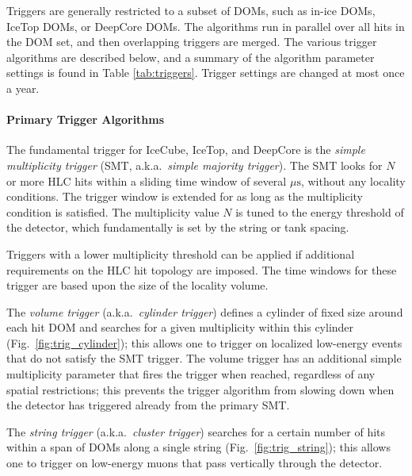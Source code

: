 Triggers are generally restricted to a subset of DOMs, such as in-ice DOMs,
IceTop DOMs, or DeepCore DOMs.  The algorithms run in parallel over all
hits in the DOM set, and then overlapping triggers are merged.   The
various trigger algorithms are described below, and a summary of the
algorithm parameter settings is found in Table \ref{tab:triggers}.  Trigger
settings are changed at most once a year.

\paragraph{Primary Trigger Algorithms}

The fundamental trigger for IceCube, IceTop, and DeepCore is the \emph{simple
multiplicity trigger} (SMT, a.k.a.~\emph{simple majority trigger}).  The
SMT looks for $N$ or more HLC hits within a sliding time window of several
$\mu\mathrm{s}$, without any locality conditions.  The trigger window is
extended for as long as the multiplicity condition is satisfied.
The multiplicity value $N$ is tuned to the energy threshold of the
detector, which fundamentally is set by the string or tank spacing. 

Triggers with a lower multiplicity threshold can be applied if additional requirements on the
HLC hit topology are imposed.  The time windows for these trigger are based upon the
size of the locality volume.

The \emph{volume trigger} (a.k.a.~\emph{cylinder
  trigger}) defines a cylinder of fixed size around each hit DOM and
searches for a given multiplicity within this cylinder
(Fig.~\ref{fig:trig_cylinder}); this allows one to trigger on localized
low-energy events that do not satisfy the SMT trigger.  The volume trigger
has an additional simple multiplicity parameter that fires the trigger when
reached, regardless of any spatial restrictions; this prevents the trigger
algorithm from slowing down when the detector has triggered already from
the primary SMT.

The \emph{string trigger} (a.k.a.~\emph{cluster trigger}) searches for a
certain number of hits within a span of DOMs along a single
string (Fig.~\ref{fig:trig_string}); this allows one to trigger on
low-energy muons that pass vertically 
through the detector.  

